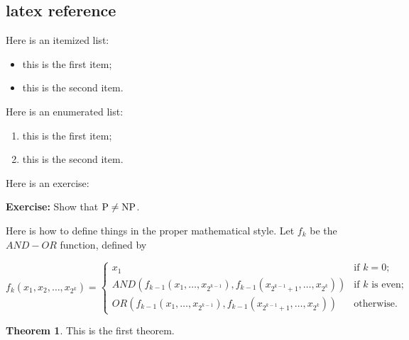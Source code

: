 \documentclass[twoside]{article}
\newcounter{lecnum}
\theoremstyle{definition}
\newtheorem{theorem}{Theorem}[lecnum]
\begin{document}
\subsection{latex reference}

Here is an itemized list:
\begin{itemize}
\item this is the first item;
\item this is the second item.
\end{itemize}

Here is an enumerated list:
\begin{enumerate}
\item this is the first item;
\item this is the second item.
\end{enumerate}

Here is an exercise:

{\bf Exercise:}  Show that ${\rm P}\ne{\rm NP}$.

Here is how to define things in the proper mathematical style.
Let $f_k$ be the $AND-OR$ function, defined by

\[ f_k(x_1, x_2, \ldots, x_{2^k}) = \left\{ \begin{array}{ll}

	x_1 & \mbox{if $k = 0$;} \\

	AND(f_{k-1}(x_1, \ldots, x_{2^{k-1}}),
	   f_{k-1}(x_{2^{k-1} + 1}, \ldots, x_{2^k}))
	 & \mbox{if $k$ is even;} \\

	OR(f_{k-1}(x_1, \ldots, x_{2^{k-1}}),
	   f_{k-1}(x_{2^{k-1} + 1}, \ldots, x_{2^k}))
	& \mbox{otherwise.}
	\end{array}
	\right. \]

\begin{theorem}
This is the first theorem.
\end{theorem}
\end{document}
